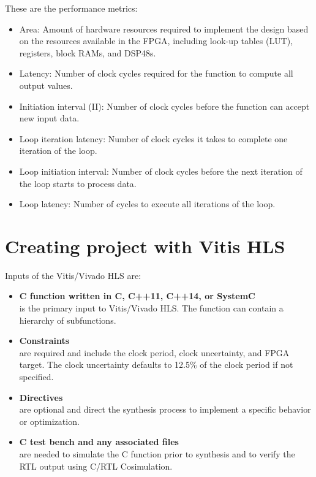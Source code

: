 \par These are the performance metrics:
\begin{itemize}
  \item Area: Amount of hardware resources required to implement the design based on the resources
  available in the FPGA, including look-up tables (LUT), registers, block RAMs, and DSP48s.
  \item Latency: Number of clock cycles required for the function to compute all output values.
  \item Initiation interval (II): Number of clock cycles before the function can accept new input data.
  \item Loop iteration latency: Number of clock cycles it takes to complete one iteration of the loop.
  \item Loop initiation interval: Number of clock cycles before the next iteration of the loop starts to
  process data.
  \item Loop latency: Number of cycles to execute all iterations of the loop.
\end{itemize}

\clearpage
\section{Creating project with Vitis HLS}
Inputs of the Vitis/Vivado HLS are:
\begin{itemize}
  \item \textbf{C function written in C, C++11, C++14, or SystemC}\\ is the primary input to Vitis/Vivado HLS. The function can contain a hierarchy of subfunctions.
  \item \textbf{Constraints}\\ are required and include the clock period, clock uncertainty, and FPGA target. The clock uncertainty defaults to 12.5\% of the clock period if not specified.
  \item \textbf{Directives}\\ are optional and direct the synthesis process to implement a specific behavior or optimization.
  \item \textbf{C test bench and any associated files}\\ are needed to simulate the C function prior to synthesis and to verify the RTL output using C/RTL Cosimulation.
\end{itemize}

